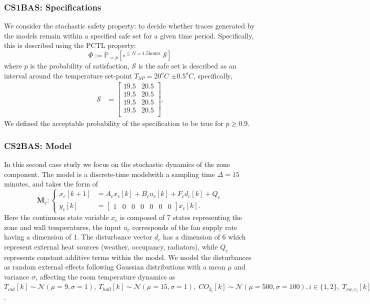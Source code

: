 \subsubsection{CS1BAS: Specifications}
We consider the stochastic safety property:  to decide whether traces generated by the models remain within a specified safe set for a given time period. Specifically, this is described using the PCTL property:
\begin{equation*}
\Phi:= \mathbb{P}_{= p} [\square^{\le N=1.5\text{hours}}\; \mathcal{S}]
\end{equation*}
where $p$ is the probability of satisfaction, $\mathcal{S}$ is the safe set is described as an interval around the temperature set-point $T_{SP} = 20^oC$ $\pm 0.5^oC$, specifically, 
\begin{align*}
\mathcal{S}&=\begin{bmatrix}
19.5 & 20.5 \\
19.5 & 20.5 \\
19.5 & 20.5 \\
19.5 & 20.5 \\
\end{bmatrix}.
\end{align*}
We defined the acceptable probability of the specification to be true for $p \ge 0.9$.

\subsubsection{CS2BAS: Model} 
In this second case study we focus on the {stochastic} dynamics of the zone component. The model is a discrete-time modelwith a sampling time $\Delta = 15$ minutes, and takes the form of
\begin{equation}
	\textbf{M}_{c}:
	\begin{cases}
	x_c[k+1] &= 
	A_{c}x_c[k] +B_cu_c[k]	+ F_{c}d_c[k]+ Q_c\\
	y_c[k]   &= \begin{bmatrix}
	1&0&0&0&0&0&0 \end{bmatrix}x_c[k]. 
	\end{cases}%
	\label{eqn:Mc}
\end{equation}
Here the continuous state variable $x_c$ is composed of 7 states representing the zone and wall temperatures, the input $u_c$ corresponds of the fan supply rate having a dimension of 1. The disturbance vector $d_c$ has a dimension of 6 which represent external heat sources (weather, occupancy, radiators), while $Q_c$ represents constant additive terms within the model. We model the disturbances as random external effects following  Gaussian distributions with a mean $\mu$ and variance $\sigma$,  affecting the room temperature dynamics as $T_{out}[k] \sim  \mathcal{N}(\mu=9,\sigma=1),~T_{hall}[k] \sim \mathcal{N}(\mu=15,\sigma=1),\; CO_{2_i}[k] \sim  \mathcal{N}(\mu=500,\sigma=100), i \in \{1,2\},\;
T_{rw,r_i}[k] \sim  \mathcal{N} (\mu =35, \sigma=5), i \in \{1,2\}$.\\

